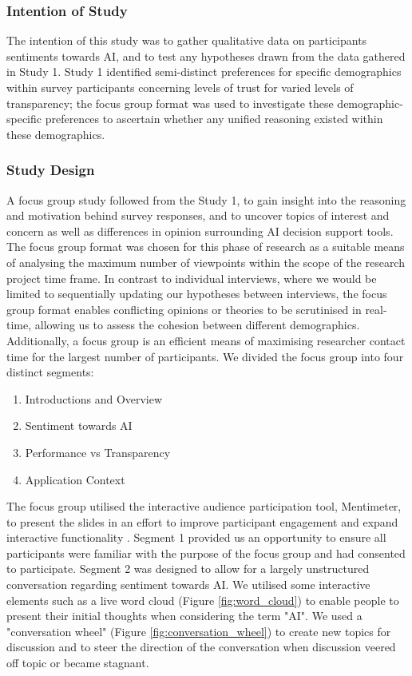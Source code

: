 \documentclass[manuscript,screen,review]{acmart}
\begin{document}
\subsubsection{Intention of Study}
\label{study2_intentions}
The intention of this study was to gather qualitative data on participants sentiments towards AI, and to test any hypotheses drawn from the data gathered in Study 1. Study 1 identified semi-distinct preferences for specific demographics within survey participants concerning levels of trust for varied levels of transparency; the focus group format was used to investigate these demographic-specific preferences to ascertain whether any unified reasoning existed within these demographics.

\subsubsection{Study Design}
\label{study2_design}
 
A focus group study followed from the Study 1, to gain insight into the reasoning and motivation behind survey responses, and to uncover topics of interest and concern as well as differences in opinion surrounding AI decision support tools.\\ 

The focus group format was chosen for this phase of research as a suitable means of analysing the maximum number of viewpoints within the scope of the research project time frame. In contrast to individual interviews, where we would be limited to sequentially updating our hypotheses between interviews, the focus group format enables conflicting opinions or theories to be scrutinised in real-time, allowing us to assess the cohesion between different demographics. Additionally, a focus group is an efficient means of maximising researcher contact time for the largest number of participants. We divided the focus group into four distinct segments:
\begin{enumerate}
    \item Introductions and Overview
    \item Sentiment towards AI
    \item Performance vs Transparency
    \item Application Context
\end{enumerate}

The focus group utilised the interactive audience participation tool, Mentimeter, to present the slides in an effort to improve participant engagement and expand interactive functionality \cite{Mayhew2020}. Segment 1 provided us an opportunity to ensure all participants were familiar with the purpose of the focus group and had consented to participate. Segment 2 was designed to allow for a largely unstructured conversation regarding sentiment towards AI. We utilised some interactive elements such as a live word cloud (Figure \ref{fig:word_cloud}) to enable people to present their initial thoughts when considering the term "AI". We used a "conversation wheel" (Figure \ref{fig:conversation_wheel}) to create new topics for discussion and to steer the direction of the conversation when discussion veered off topic or became stagnant.\\
\end{document}
